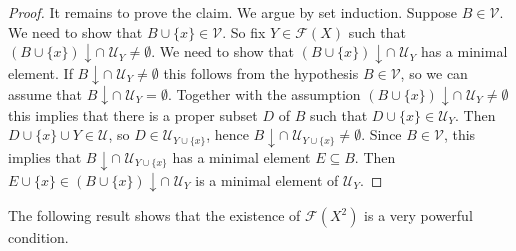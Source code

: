\documentclass{amsart}
\newcommand{\ca}{\mathcal}
\theoremstyle{plain}
\theoremstyle{definition}
\newcommand{\F}{\mathcal{F}}
\begin{document}
\begin{proof}
 It remains to prove the claim. We argue by set induction. Suppose $B\in \ca V$. We need to show that $B\cup \{x\}\in \ca V$. So fix $Y\in \F(X)$ such that $(B\cup \{x\})\! \downarrow \cap \; \ca U_Y  \neq \emptyset$. We need to show that $(B\cup \{x\})\! \downarrow \cap \; \ca U_Y $ has a minimal element. If $B\! \downarrow \cap \; \ca U_Y \neq \emptyset$ this follows from the hypothesis $B\in \ca V$, so we can assume that $B\! \downarrow \cap \; \ca U_Y = \emptyset$. Together with the assumption $(B\cup \{x\})\! \downarrow \cap \; \ca U_Y  \neq \emptyset$ this implies that there is a proper subset $D$ of $B$ such that $D\cup \{x\} \in \ca U_Y$. Then $D \cup \{x\} \cup Y \in \ca U$, so $D \in \ca U_{Y\cup \{x\}}$, hence $ B \! \downarrow \cap \; \ca U_{Y \cup \{x\}} \neq \emptyset$. Since $B\in \ca V$, this implies that $B \! \downarrow\cap \; \ca U_{Y \cup \{x\}}$ has a minimal element $E \subseteq B$. Then $E\cup \{x\} \in  (B\cup \{x\})\! \downarrow\cap \; \ca U_Y$ is a minimal element of $\ca U_Y$. 
 \end{proof}

The following result shows that the existence of $\F(X^2)$ is a very powerful condition. 
\end{document}
